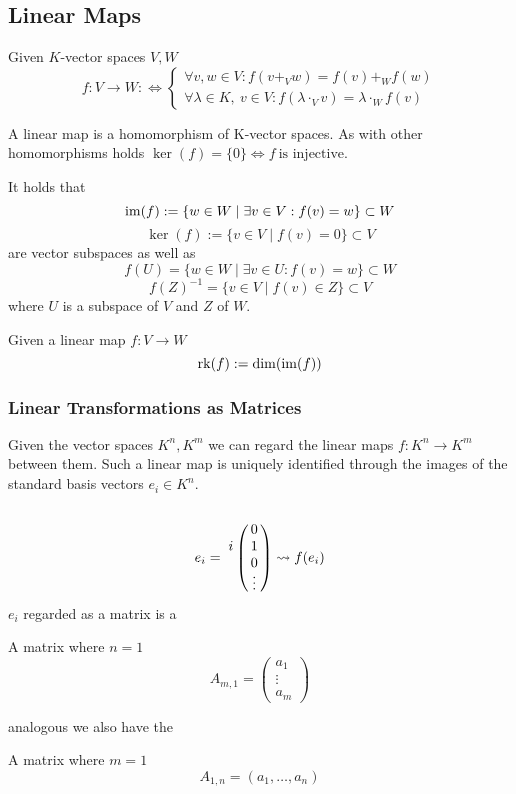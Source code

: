 \subsection{Linear Maps}
\begin{definition}
   Given \(K\)-vector spaces \(V, W\)
   \[f: V \to W :\iff \begin{cases}
         \forall v, w \in V: f(v +_V w) = f(v) +_W f(w) \\
         \forall \lambda \in K,~v \in V: f(\lambda \cdot_V v) = \lambda \cdot_W f(v)
      \end{cases}\]
\end{definition}
\begin{remark}
   A linear map is a homomorphism of K-vector spaces.
   As with other homomorphisms holds \(\ker(f) = \{0\} \iff f~\text{is injective}\).
\end{remark}
\begin{remark}
   It holds that
   \[\operatorname{im}(f) := \{w \in W \mid \exists v \in V: f(v) = w\} \subset W\]
   \[\ker(f) := \{v \in V \mid f(v) = 0\} \subset V\]
   are vector subspaces as well as
   \[f(U) = \{w \in W \mid \exists v \in U: f(v) = w\} \subset W\]
   \[f(Z)^{-1} = \{v \in V \mid f(v) \in Z\} \subset V\]
   where \(U\) is a subspace of \(V\) and \(Z\) of \(W\).
\end{remark}

\begin{definition}\label{def:linmaprank}
   Given a linear map \(f: V \to W\)
   \[\operatorname{rk}(f) := \dim(\operatorname{im}(f))\]
\end{definition}

\subsubsection{Linear Transformations as Matrices}
Given the vector spaces \(K^n, K^m\) we can regard the linear maps \(f: K^n \to K^m\) between them.
Such a linear map is uniquely identified through the images of the standard basis vectors \(e_i \in K^n\).
\[e_i = \bordermatrix{
      ~ &   \cr
        & 0 \cr
      i & 1 \cr
        & 0 \cr
        & \vdots} \rightsquigarrow f(e_i)\]
\(e_i\) regarded as a matrix is a
\begin{definition}
   A matrix where \(n = 1\)
   \[A_{m,1} = \begin{pmatrix} a_1 \\ \vdots \\ a_m \end{pmatrix}\]
\end{definition}
analogous we also have the
\begin{definition}
   A matrix where \(m = 1\)
   \[A_{1,n} = (a_1, \ldots, a_n)\]
\end{definition}

